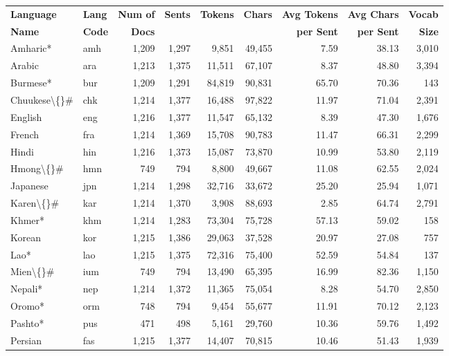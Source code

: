 \begin{table}[t]
\centering
\small
\setlength{\tabcolsep}{4pt}
\begin{tabular}{l l r r r r r r r}
\toprule
\textbf{Language} & \textbf{Lang} & \textbf{Num of} & \textbf{Sents} & \textbf{Tokens} & \textbf{Chars} & \textbf{Avg Tokens} & \textbf{Avg Chars} & \textbf{Vocab} \\
\textbf{Name} & \textbf{Code} & \textbf{Docs} &  &  &  & \textbf{per Sent} & \textbf{per Sent} & \textbf{Size} \\
\midrule
Amharic* & amh & 1,209 & 1,297 & 9,851 & 49,455 & 7.59 & 38.13 & 3,010 \\
Arabic & ara & 1,213 & 1,375 & 11,511 & 67,107 & 8.37 & 48.80 & 3,394 \\
Burmese* & bur & 1,209 & 1,291 & 84,819 & 90,831 & 65.70 & 70.36 & 143 \\
Chuukese\textbackslash\{\}\# & chk & 1,214 & 1,377 & 16,488 & 97,822 & 11.97 & 71.04 & 2,391 \\
English & eng & 1,216 & 1,377 & 11,547 & 65,132 & 8.39 & 47.30 & 1,676 \\
French & fra & 1,214 & 1,369 & 15,708 & 90,783 & 11.47 & 66.31 & 2,299 \\
Hindi & hin & 1,216 & 1,373 & 15,087 & 73,870 & 10.99 & 53.80 & 2,119 \\
Hmong\textbackslash\{\}\# & hmn & 749 & 794 & 8,800 & 49,667 & 11.08 & 62.55 & 2,024 \\
Japanese & jpn & 1,214 & 1,298 & 32,716 & 33,672 & 25.20 & 25.94 & 1,071 \\
Karen\textbackslash\{\}\# & kar & 1,214 & 1,370 & 3,908 & 88,693 & 2.85 & 64.74 & 2,791 \\
Khmer* & khm & 1,214 & 1,283 & 73,304 & 75,728 & 57.13 & 59.02 & 158 \\
Korean & kor & 1,215 & 1,386 & 29,063 & 37,528 & 20.97 & 27.08 & 757 \\
Lao* & lao & 1,215 & 1,375 & 72,316 & 75,400 & 52.59 & 54.84 & 137 \\
Mien\textbackslash\{\}\# & ium & 749 & 794 & 13,490 & 65,395 & 16.99 & 82.36 & 1,150 \\
Nepali* & nep & 1,214 & 1,372 & 11,365 & 75,054 & 8.28 & 54.70 & 2,850 \\
Oromo* & orm & 748 & 794 & 9,454 & 55,677 & 11.91 & 70.12 & 2,123 \\
Pashto* & pus & 471 & 498 & 5,161 & 29,760 & 10.36 & 59.76 & 1,492 \\
Persian & fas & 1,215 & 1,377 & 14,407 & 70,815 & 10.46 & 51.43 & 1,939 \\

\end{tabular}
\end{table}

